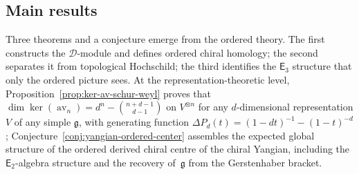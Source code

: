 \documentclass[11pt,reqno]{amsart}
\theoremstyle{definition}
\theoremstyle{remark}
\newcommand{\cD}{\mathcal{D}}
\newcommand{\Etwo}{\mathsf{E}_{2}}
\newcommand{\Ethree}{\mathsf{E}_{3}}
\DeclareMathOperator{\av}{av}
\newcommand{\fg}{\mathfrak{g}}
\numberwithin{equation}{section}
\begin{document}
\subsection{Main results}

Three theorems and a conjecture emerge from the ordered theory.
The first constructs the $\cD$-module and defines ordered
chiral homology; the second separates it from topological
Hochschild; the third identifies the $\Ethree$ structure
that only the ordered picture sees.
At the representation-theoretic level,
Proposition~\ref{prop:ker-av-schur-weyl} proves that
$\dim\ker(\av_n) = d^n -
\binom{n+d-1}{d-1}$ on $V^{\otimes n}$ for any
$d$-dimensional representation $V$ of any simple $\fg$,
with generating function
$\Delta P_d(t) = (1-dt)^{-1} - (1-t)^{-d}$;
Conjecture~\ref{conj:yangian-ordered-center} assembles
the expected global structure of the ordered derived
chiral centre of the chiral Yangian, including the
$\Etwo$-algebra structure and the recovery of~$\fg$
from the Gerstenhaber bracket.
\end{document}

